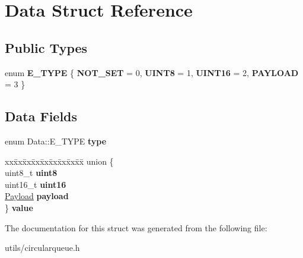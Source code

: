 \hypertarget{struct_data}{}\section{Data Struct Reference}
\label{struct_data}
\subsection*{Public Types}
\begin{DoxyCompactItemize}
\item 
\mbox{\label{struct_data_a949c540719e2dc9e8b08de7ad656fcf3}} 
enum {\bfseries E\+\_\+\+T\+Y\+PE} \{ {\bfseries N\+O\+T\+\_\+\+S\+ET} = 0, 
{\bfseries U\+I\+N\+T8} = 1, 
{\bfseries U\+I\+N\+T16} = 2, 
{\bfseries P\+A\+Y\+L\+O\+AD} = 3
 \}
\end{DoxyCompactItemize}
\subsection*{Data Fields}
\begin{DoxyCompactItemize}
\item 
\mbox{\label{struct_data_af2291e68d0cbdbde4ea4402f217fb994}} 
enum Data\+::\+E\+\_\+\+T\+Y\+PE {\bfseries type}
\item 
\mbox{\label{struct_data_aa56ca9a25fefdd6b25b3468184c036fd}} 
\begin{tabbing}
xx\=xx\=xx\=xx\=xx\=xx\=xx\=xx\=xx\=\kill
union \{\\
\>uint8\_t {\bfseries uint8}\\
\>uint16\_t {\bfseries uint16}\\
\>\mbox{\hyperlink{struct_payload}{Payload}} {\bfseries payload}\\
\} {\bfseries value}\\

\end{tabbing}\end{DoxyCompactItemize}


The documentation for this struct was generated from the following file\+:\begin{DoxyCompactItemize}
\item 
utils/circularqueue.\+h\end{DoxyCompactItemize}
